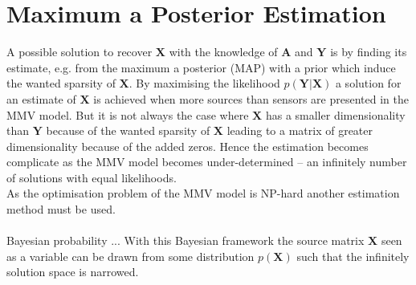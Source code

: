 \section{Maximum a Posterior Estimation}
A possible solution to recover $\mathbf{X}$ with the knowledge of $\mathbf{A}$ and $\mathbf{Y}$ is by finding its estimate, e.g. from the maximum a posterior (MAP) with a prior which induce the wanted sparsity of $\mathbf{X}$. By maximising the likelihood $p(\mathbf{Y} \vert \mathbf{X})$ a solution for an estimate of $\mathbf{X}$ is achieved when more sources than sensors are presented in the MMV model. But it  is not always the case where $\mathbf{X}$ has a smaller dimensionality than $\mathbf{Y}$ because of the wanted sparsity of $\mathbf{X}$ leading to a matrix of greater dimensionality because of the added zeros. Hence the estimation becomes complicate as the MMV model becomes under-determined -- an infinitely number of solutions with equal likelihoods.
\\
As the optimisation problem of the MMV model is NP-hard another estimation method must be used.
\\ \\
Bayesian probability  ... With this Bayesian framework the source matrix $\mathbf{X}$ seen as a variable can be drawn from some distribution $p(\mathbf{X})$ such that the infinitely solution space is narrowed. 
\\
